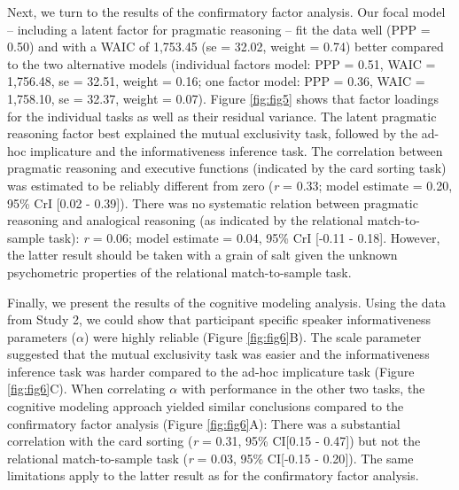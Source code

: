 \documentclass[
  man,floatsintext]{apa6}
\begin{document}
Next, we turn to the results of the confirmatory factor analysis. Our focal model -- including a latent factor for pragmatic reasoning -- fit the data well (PPP = 0.50) and with a WAIC of 1,753.45 (se = 32.02, weight = 0.74) better compared to the two alternative models (individual factors model: PPP = 0.51, WAIC = 1,756.48, se = 32.51, weight = 0.16; one factor model: PPP = 0.36, WAIC = 1,758.10, se = 32.37, weight = 0.07). Figure \ref{fig:fig5} shows that factor loadings for the individual tasks as well as their residual variance. The latent pragmatic reasoning factor best explained the mutual exclusivity task, followed by the ad-hoc implicature and the informativeness inference task. The correlation between pragmatic reasoning and executive functions (indicated by the card sorting task) was estimated to be reliably different from zero (\emph{r} = 0.33; model estimate = 0.20, 95\% CrI {[}0.02 - 0.39{]}). There was no systematic relation between pragmatic reasoning and analogical reasoning (as indicated by the relational match-to-sample task): \emph{r} = 0.06; model estimate = 0.04, 95\% CrI {[}-0.11 - 0.18{]}. However, the latter result should be taken with a grain of salt given the unknown psychometric properties of the relational match-to-sample task.

Finally, we present the results of the cognitive modeling analysis. Using the data from Study 2, we could show that participant specific speaker informativeness parameters (\(\alpha\)) were highly reliable (Figure \ref{fig:fig6}B). The scale parameter suggested that the mutual exclusivity task was easier and the informativeness inference task was harder compared to the ad-hoc implicature task (Figure \ref{fig:fig6}C). When correlating \(\alpha\) with performance in the other two tasks, the cognitive modeling approach yielded similar conclusions compared to the confirmatory factor analysis (Figure \ref{fig:fig6}A): There was a substantial correlation with the card sorting (\emph{r} = 0.31, 95\% CI{[}0.15 - 0.47{]}) but not the relational match-to-sample task (\emph{r} = 0.03, 95\% CI{[}-0.15 - 0.20{]}). The same limitations apply to the latter result as for the confirmatory factor analysis.
\end{document}
